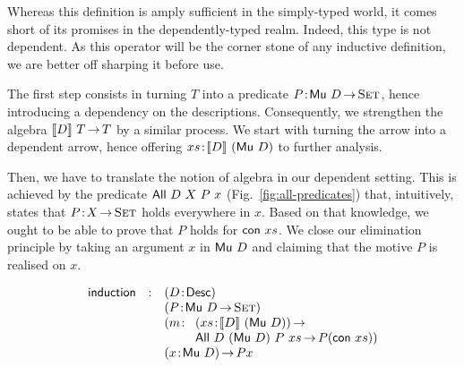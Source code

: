 Whereas this definition is amply sufficient in the simply-typed world,
it comes short of its promises in the dependently-typed realm. Indeed,
this type is not dependent. As this operator will be the corner stone
of any inductive definition, we are better off sharping it before use.

The first step consists in turning $T$ into a predicate
$\Bhab{P}{\Mu{D} \To \Set}$, hence introducing a dependency on the
descriptions. Consequently, we strengthen the algebra $\descop{D}{T}
\To T$ by a similar process. We start with turning the arrow into a
dependent arrow, hence offering $\Bhab{xs}{\descop{D}{(\Mu{D})}}$ to
further analysis. 

Then, we have to translate the notion of algebra in our dependent
setting. This is achieved by the predicate $\All{D}{X}{P}{x}$
(Fig.~\ref{fig:all-predicates}) that, intuitively, states that
$\Bhab{P}{X \To \Set}$ holds everywhere in $x$. Based on that
knowledge, we ought to be able to prove that $P$ holds for
$\Con{xs}$. We close our elimination principle by taking an argument
$x$ in $\Mu{D}$ and claiming that the motive $P$ is realised on $x$.

\[
\begin{array}{lcll}
\F{induction} & : & \multicolumn{2}{l}{\PITEL{D}{\Desc}}                   \\
              &   & \multicolumn{2}{l}{\PITEL{P}{\Mu{D} \To \Set}}         \\
              &   & \PITEL{m}{& \PI{xs}{\descop{D}{(\Mu{D})}}              \\
              &   &           & \All{D}{(\Mu{D})}{P}{xs} \To P (\Con{xs})} \\
              &   & \multicolumn{2}{l}{\PI{x}{\Mu{D}} P x}
\end{array}
\]

